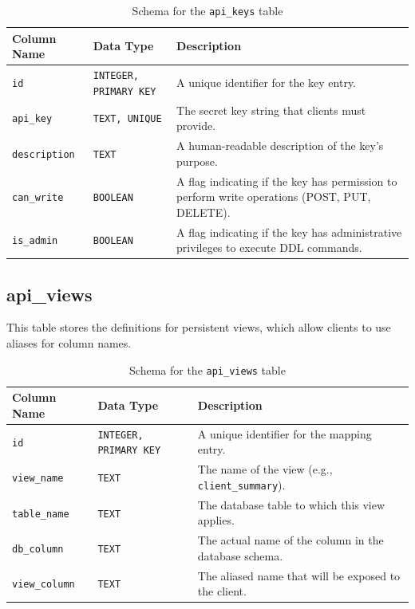 \documentclass[12pt, a4paper]{report}
\begin{document}
\begin{table}[h!] %
    \centering %
    \caption{Schema for the \lstinline|api_keys| table} %
    \label{tab:api_keys} %
    \begin{tabularx}{\textwidth}{@{} l l X @{}}
        \toprule
        \textbf{Column Name} & \textbf{Data Type} & \textbf{Description} \\
        \midrule
        \lstinline|id| & \texttt{INTEGER, PRIMARY KEY} & A unique identifier for the key entry. \\
        \lstinline|api_key| & \texttt{TEXT, UNIQUE} & The secret key string that clients must provide. \\
        \lstinline|description| & \texttt{TEXT} & A human-readable description of the key's purpose. \\
        \lstinline|can_write| & \texttt{BOOLEAN} & A flag indicating if the key has permission to perform write operations (POST, PUT, DELETE). \\
        \lstinline|is_admin| & \texttt{BOOLEAN} & A flag indicating if the key has administrative privileges to execute DDL commands. \\
        \bottomrule
    \end{tabularx}
\end{table} %


\subsection*{api\_views}
This table stores the definitions for persistent views, which allow clients to use aliases for column names.

\begin{table}[h!]
    \centering
    \caption{Schema for the \lstinline|api_views| table}
    \label{tab:api_views}
    \begin{tabularx}{\textwidth}{@{} l l X @{}}
        \toprule
        \textbf{Column Name} & \textbf{Data Type} & \textbf{Description} \\
        \midrule
        \lstinline|id| & \texttt{INTEGER, PRIMARY KEY} & A unique identifier for the mapping entry. \\
        \lstinline|view_name| & \texttt{TEXT} & The name of the view (e.g., \lstinline|client_summary|). \\
        \lstinline|table_name| & \texttt{TEXT} & The database table to which this view applies. \\
        \lstinline|db_column| & \texttt{TEXT} & The actual name of the column in the database schema. \\
        \lstinline|view_column| & \texttt{TEXT} & The aliased name that will be exposed to the client. \\
        \bottomrule
    \end{tabularx}
\end{table}
\end{document}
